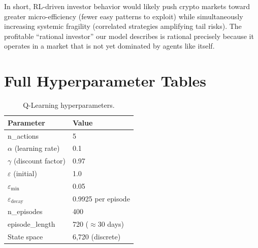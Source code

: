 \documentclass[11pt,a4paper]{article}
\begin{document}
In short, RL-driven investor behavior would likely push crypto markets toward greater micro-efficiency (fewer easy patterns to exploit) while simultaneously increasing systemic fragility (correlated strategies amplifying tail risks). The profitable ``rational investor'' our model describes is rational precisely because it operates in a market that is not yet dominated by agents like itself.

\appendix
\section{Full Hyperparameter Tables}

\begin{table}[H]
\centering
\caption{Q-Learning hyperparameters.}
\begin{tabular}{ll}
\toprule
Parameter & Value \\
\midrule
n\_actions       & 5 \\
$\alpha$ (learning rate) & 0.1 \\
$\gamma$ (discount factor) & 0.97 \\
$\varepsilon$ (initial) & 1.0 \\
$\varepsilon_{\min}$ & 0.05 \\
$\varepsilon_{\text{decay}}$ & 0.9925 per episode \\
n\_episodes      & 400 \\
episode\_length  & 720 ($\approx$30 days) \\
State space      & 6,720 (discrete) \\
\bottomrule
\end{tabular}
\end{table}
\end{document}
